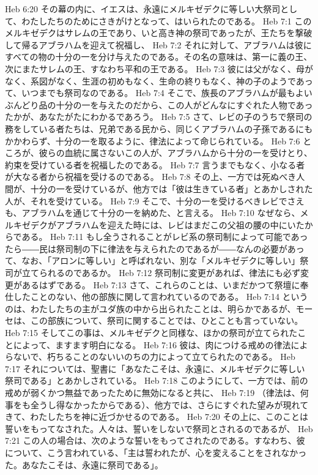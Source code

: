 Heb 6:20  その幕の内に、イエスは、永遠にメルキゼデクに等しい大祭司として、わたしたちのためにさきがけとなって、はいられたのである。
Heb 7:1  このメルキゼデクはサレムの王であり、いと高き神の祭司であったが、王たちを撃破して帰るアブラハムを迎えて祝福し、
Heb 7:2  それに対して、アブラハムは彼にすべての物の十分の一を分け与えたのである。その名の意味は、第一に義の王、次にまたサレムの王、すなわち平和の王である。
Heb 7:3  彼には父がなく、母がなく、系図がなく、生涯の初めもなく、生命の終りもなく、神の子のようであって、いつまでも祭司なのである。
Heb 7:4  そこで、族長のアブラハムが最もよいぶんどり品の十分の一を与えたのだから、この人がどんなにすぐれた人物であったかが、あなたがたにわかるであろう。
Heb 7:5  さて、レビの子のうちで祭司の務をしている者たちは、兄弟である民から、同じくアブラハムの子孫であるにもかかわらず、十分の一を取るように、律法によって命じられている。
Heb 7:6  ところが、彼らの血統に属さないこの人が、アブラハムから十分の一を受けとり、約束を受けている者を祝福したのである。
Heb 7:7  言うまでもなく、小なる者が大なる者から祝福を受けるのである。
Heb 7:8  その上、一方では死ぬべき人間が、十分の一を受けているが、他方では「彼は生きている者」とあかしされた人が、それを受けている。
Heb 7:9  そこで、十分の一を受けるべきレビでさえも、アブラハムを通じて十分の一を納めた、と言える。
Heb 7:10  なぜなら、メルキゼデクがアブラハムを迎えた時には、レビはまだこの父祖の腰の中にいたからである。
Heb 7:11  もし全うされることがレビ系の祭司制によって可能であったら――民は祭司制の下に律法を与えられたのであるが――なんの必要があって、なお、「アロンに等しい」と呼ばれない、別な「メルキゼデクに等しい」祭司が立てられるのであるか。
Heb 7:12  祭司制に変更があれば、律法にも必ず変更があるはずである。
Heb 7:13  さて、これらのことは、いまだかつて祭壇に奉仕したことのない、他の部族に関して言われているのである。
Heb 7:14  というのは、わたしたちの主がユダ族の中から出られたことは、明らかであるが、モーセは、この部族について、祭司に関することでは、ひとことも言っていない。
Heb 7:15  そしてこの事は、メルキゼデクと同様な、ほかの祭司が立てられたことによって、ますます明白になる。
Heb 7:16  彼は、肉につける戒めの律法によらないで、朽ちることのないいのちの力によって立てられたのである。
Heb 7:17  それについては、聖書に「あなたこそは、永遠に、メルキゼデクに等しい祭司である」とあかしされている。
Heb 7:18  このようにして、一方では、前の戒めが弱くかつ無益であったために無効になると共に、
Heb 7:19  （律法は、何事をも全うし得なかったからである）、他方では、さらにすぐれた望みが現れてきて、わたしたちを神に近づかせるのである。
Heb 7:20  その上に、このことは誓いをもってなされた。人々は、誓いをしないで祭司とされるのであるが、
Heb 7:21  この人の場合は、次のような誓いをもってされたのである。すなわち、彼について、こう言われている、「主は誓われたが、心を変えることをされなかった。あなたこそは、永遠に祭司である」。
